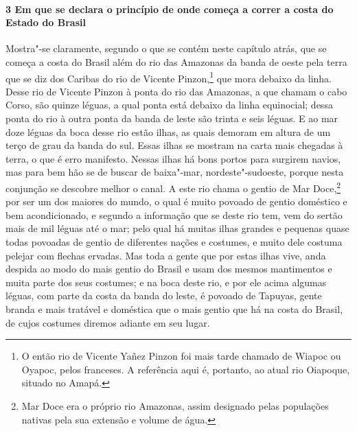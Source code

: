 \begin{linenumbers}
\paragraph{3 Em que se declara o princípio de onde começa a correr a costa do Estado do
Brasil} \quad
Mostra"-se claramente, segundo o que se contém neste capítulo atrás, que se começa a costa
do Brasil além do rio das Amazonas da banda de oeste pela terra que se diz dos Caribas do
rio de Vicente Pinzon,\footnote{ O então rio de Vicente Yañez Pinzon foi mais tarde
chamado de Wiapoc ou Oyapoc, pelos franceses. A referência aqui é, portanto, ao atual rio
Oiapoque, situado no Amapá.} que mora debaixo da linha. Desse rio de Vicente Pinzon à
ponta do rio das Amazonas, a que chamam o cabo Corso, são quinze léguas, a qual ponta está
debaixo da linha equinocial; dessa ponta do rio à outra ponta da banda de leste são trinta
e seis léguas. E ao mar doze léguas da boca desse rio estão ilhas, as quais demoram em
altura de um terço de grau da banda do sul. Essas ilhas se mostram na carta mais chegadas
à terra, o que é erro manifesto. Nessas ilhas há bons portos para surgirem navios, mas
para bem hão se de buscar de baixa"-mar, nordeste"-sudoeste, porque nesta conjunção se
descobre melhor o canal. A este rio chama o gentio de Mar Doce,\footnote{ Mar Doce era o
próprio rio Amazonas, assim designado pelas populações nativas pela sua extensão e volume
de água.} por ser um dos maiores do mundo, o qual é muito povoado de gentio doméstico e
bem acondicionado, e segundo a informação que se deste rio tem, vem do sertão mais de mil
léguas até o mar; pelo qual há muitas ilhas grandes e pequenas quase todas povoadas de
gentio de diferentes nações e costumes, e muito dele costuma pelejar com flechas ervadas.
Mas toda a gente que por estas ilhas vive, anda despida ao modo do mais gentio do Brasil e
usam dos mesmos mantimentos e muita parte dos seus costumes; e na boca deste rio, e por
ele acima algumas léguas, com parte da costa da banda do leste, é povoado de Tapuyas,
gente branda e mais tratável e doméstica que o mais gentio que há na costa do Brasil, de
cujos costumes diremos adiante em seu lugar.


\end{linenumbers}
